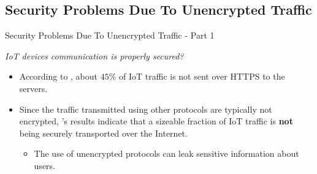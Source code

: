 \documentclass[10pt]{beamer}
\begin{document}
\subsection{Security Problems Due To Unencrypted Traffic}
\begin{frame}{Security Problems Due To Unencrypted Traffic - Part 1}

\begin{alertblock}{}
\textit{IoT devices communication is properly secured?}
\end{alertblock}

\begin{itemize}
\justifying

\item According to \citet{ITPAReport}, about $45\%$ of IoT traffic is not sent over HTTPS to the servers. 

\item Since the traffic transmitted using other protocols are typically not encrypted, \citet{ITPAReport}'s results indicate that a sizeable fraction of IoT traffic is \textbf{not} being securely transported over the Internet.

\begin{itemize}
\item The use of unencrypted protocols can leak sensitive information about users.
\end{itemize}

\end{itemize}


\end{frame} 
\end{document}
